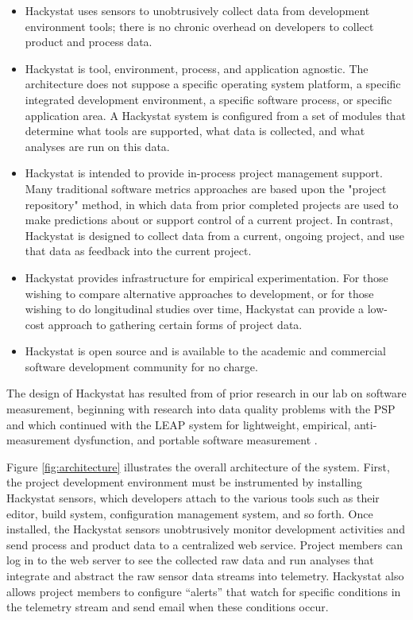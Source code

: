 \documentclass[11pt,twocolumn]{article}
\begin{document}
\begin{itemize}

\item Hackystat uses sensors to unobtrusively collect data from development
environment tools; there is no chronic overhead on developers to collect
product and process data.

\item Hackystat is tool, environment, process, and application agnostic.
The architecture does not suppose a specific operating system platform, a
specific integrated development environment, a specific software process,
or specific application area.  A Hackystat system is configured from a set
of modules that determine what tools are supported, what data is collected,
and what analyses are run on this data.

\item Hackystat is intended to provide in-process project management support. Many traditional software
metrics approaches are based upon the "project repository" method, in which data from prior completed
projects are used to make predictions about or support control of a current project. In contrast,
Hackystat is designed to collect data from a current, ongoing project, and use that data as feedback
into the current project. 

\item Hackystat provides infrastructure for empirical experimentation.  For
those wishing to compare alternative approaches to development, or for
those wishing to do longitudinal studies over time, Hackystat can provide a
low-cost approach to gathering certain forms of project data.

\item Hackystat is open source and is available to the academic and
commercial software development community for no charge.

\end{itemize}

The design of Hackystat \cite{csdl2-02-07,csdl2-03-12} has resulted from of prior
research in our lab on software measurement, beginning with research into
data quality problems with the PSP \cite{csdl-98-04,csdl-98-11} and which
continued with the LEAP system for lightweight, empirical, anti-measurement
dysfunction, and portable software measurement
\cite{csdl-99-08,csdl2-00-03}.


Figure \ref{fig:architecture} illustrates the overall architecture of the
system. First, the project development environment must be instrumented by
installing Hackystat sensors, which developers attach to the various tools
such as their editor, build system, configuration management system, and so
forth. Once installed, the Hackystat sensors unobtrusively monitor
development activities and send process and product data to a centralized
web service.  Project members can log in to the web server to see the
collected raw data and run analyses that integrate and abstract the raw
sensor data streams into telemetry.  Hackystat also allows project members
to configure ``alerts'' that watch for specific conditions in the telemetry
stream and send email when these conditions occur.
\end{document}
